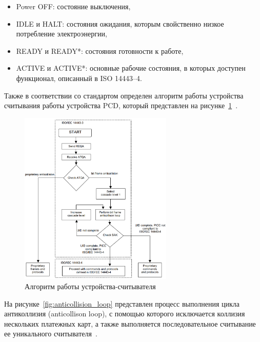 \begin{itemize}
    \item Power OFF: состояние выключения,
    \item IDLE и HALT: состояния ожидания, которым свойственно низкое потребление электроэнергии,
    \item READY и READY*: состояния готовности к работе,
    \item ACTIVE и ACTIVE*: основные рабочие состояния, в которых доступен функционал, описанный в ISO 14443--4.
\end{itemize}

Также в соответствии со стандартом определен алгоритм работы устройства считывания работы устройства PCD, который представлен на рисунке~\ref{fig:pcd_flow}~\cite{iso14443-4}.

\begin{figure}[H]
    \centering
    \includegraphics[width=0.65\textwidth]{images/research/pcd_flow}
    \caption{\centering Алгоритм работы устройства-считывателя}
    \label{fig:pcd_flow}
\end{figure}

На рисунке~\ref{fig:anticollision_loop} представлен процесс выполнения цикла антиколлизия (anticollison loop), с помощью которого исключается коллизия нескольких платежных карт, а также выполняется последовательное считывание ее уникального считывателя~\cite{iso14443-3}.


